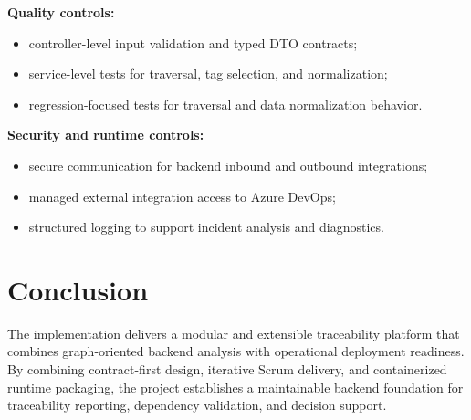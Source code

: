 \textbf{Quality controls:}
\begin{itemize}
  \item controller-level input validation and typed DTO contracts;
  \item service-level tests for traversal, tag selection, and normalization;
  \item regression-focused tests for traversal and data normalization behavior.
\end{itemize}

\textbf{Security and runtime controls:}
\begin{itemize}
  \item secure communication for backend inbound and outbound integrations;
  \item managed external integration access to Azure DevOps;
  \item structured logging to support incident analysis and diagnostics.
\end{itemize}

\section*{Conclusion}

The implementation delivers a modular and extensible traceability platform that
combines graph-oriented backend analysis with operational deployment readiness.
By combining contract-first design, iterative Scrum delivery, and containerized
runtime packaging, the project establishes a maintainable backend foundation
for traceability reporting, dependency validation, and decision support.

